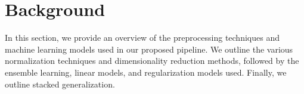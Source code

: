 \section{Background}\label{sec:background}
In this section, we provide an overview of the preprocessing techniques and machine learning models used in our proposed pipeline.
We outline the various normalization techniques and dimensionality reduction methods, followed by the ensemble learning, linear models, and regularization models used.
Finally, we outline stacked generalization.




